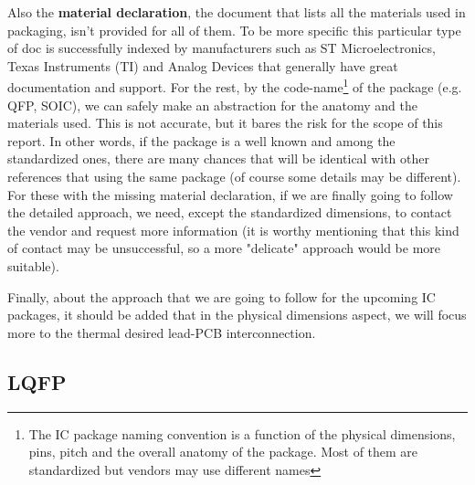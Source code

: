 \documentclass[final]{cubedoc}
\begin{document}
	Also the \textbf{material declaration}, the document that lists all the materials used in packaging, isn't provided for all of them. To be more specific this particular type of doc is successfully indexed by manufacturers such as ST Microelectronics, Texas Instruments (TI) and Analog Devices that generally have great documentation and support. For the rest, by the code-name\footnote{The IC package naming convention is a function of the physical dimensions, pins, pitch and the overall anatomy of the package. Most of them are standardized but vendors may use different names} of the package (e.g. QFP, SOIC), we can safely make an abstraction for the anatomy and the materials used. This is not accurate, but it bares the risk for the scope of this report. In other words, if the package is a well known and among the standardized ones, there are many chances that will be identical with other references that using the same package (of course some details may be different). For these with the missing material declaration, if we are finally going to follow the detailed approach, we need, except the standardized dimensions, to contact the vendor and request more information (it is worthy mentioning that this kind of contact may be unsuccessful, so a more "delicate" approach would be more suitable). 
	
	Finally, about the approach that we are going to follow for the upcoming IC packages, it should be added that in the physical dimensions aspect, we will focus more to the thermal desired lead-PCB interconnection. 
	
	
	\subsection{LQFP}
	
\end{document}
